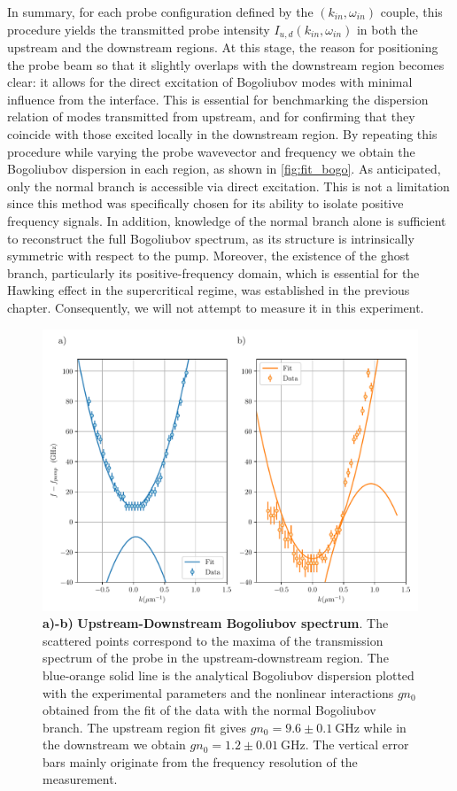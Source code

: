 In summary, for each probe configuration defined by the \((k_{in}, \omega_{in})\) couple, this procedure yields the transmitted probe intensity \(I_{u,d}(k_{in}, \omega_{in})\) in both the upstream and the downstream regions.
At this stage, the reason for positioning the probe beam so that it slightly overlaps with the downstream region becomes clear: it allows for the direct excitation of Bogoliubov modes with minimal influence from the interface. This is essential for benchmarking the dispersion relation of modes transmitted from upstream, and for confirming that they coincide with those excited locally in the downstream region.
By repeating this procedure while varying the probe wavevector and frequency we obtain the Bogoliubov dispersion in each region, as shown in \autoref{fig:fit_bogo}.  As anticipated, only the normal branch is accessible via direct excitation. This is not a limitation since this method was specifically chosen for its ability to isolate positive frequency signals. 
In addition, knowledge of the normal branch alone is sufficient to reconstruct the full Bogoliubov spectrum, as its structure is intrinsically symmetric with respect to the pump. Moreover, the existence of the ghost branch, particularly its positive-frequency domain, which is essential for the Hawking effect in the supercritical regime, was established in the previous chapter. Consequently, we will not attempt to measure it in this experiment.
\begin{figure}
    \centering
    \includegraphics[width=1\textwidth]{chap_stimulated_hawking/fig/fit_bogo.pdf}
    \caption{\textbf{a)-b)} \textbf{Upstream-Downstream Bogoliubov spectrum}. The scattered points correspond to the maxima of the transmission spectrum of the probe in the upstream-downstream region. The blue-orange solid 
    line is the analytical Bogoliubov dispersion plotted with the experimental parameters and the nonlinear interactions $gn_0$ obtained from
    the fit of the data with the normal Bogoliubov branch. The upstream region fit gives $gn_0 =9.6 \pm \SI{0.1}{\giga \hertz}$ while in the downstream we obtain $gn_0=1.2\pm \SI{0.01}{\giga \hertz}$.
    The vertical error bars mainly originate from the frequency resolution of the measurement.}
    \label{fig:fit_bogo}
\end{figure}
\bigskip 

